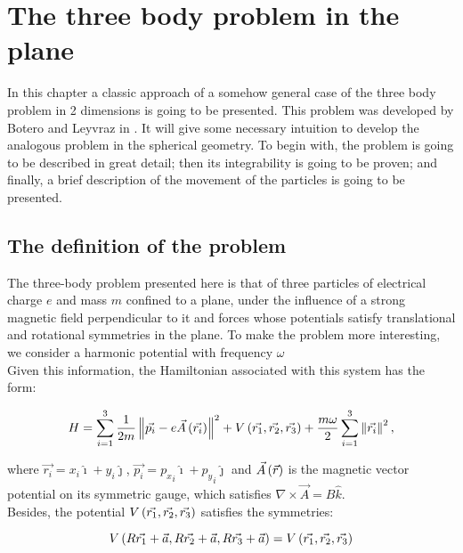 \chapter{The three body problem in the plane}

In this chapter a classic approach of a somehow general case of the three body problem in 2 dimensions is going to be presented. This problem was developed by Botero and Leyvraz in \cite{alonso}. It will give some necessary intuition to develop the analogous problem in the spherical geometry. To begin with, the problem is going to be described in great detail; then its integrability is going to be proven; and finally, a brief description of the movement of the particles is going to be presented.\\

\section{The definition of the problem}

The three-body problem presented here is that of three particles of electrical charge $e$ and mass $m$ confined to a plane, under the influence of a strong magnetic field perpendicular to it and forces whose potentials satisfy translational and rotational symmetries in the plane. To make the problem more interesting, we consider a harmonic potential with frequency $\omega$\\

Given this information, the Hamiltonian associated with this system has the form:

\begin{equation}
H = \sum_{i=1}^{3} \frac{1}{2m} \left\lVert  \vec{p_i} - 
e\vec{ A } \left( \vec{r_i} \right) \right\rVert^2
+ V \left(  \vec{r_1},\vec{r_2},\vec{r_3}  \right)
+\frac{m\omega}{2}\sum_{i=1}^{3} \left\lVert \vec{r_i} \right\rVert^2,
\label{eq:ham2d}
\end{equation}

where $\vec{r_i} = x_i \hat{\imath} + y_i \hat{\jmath}$, $\vec{p_i} = {p_x}_i\hat{\imath} + {p_y}_i\hat{\jmath}$ and $\vec{A}\left( \vec{r} \right)$ is the magnetic vector potential on its symmetric gauge, which satisfies $\nabla \times \vec{A} = B\hat{k}$.\\

Besides, the potential $V \left(  \vec{r_1},\vec{r_2},\vec{r_3}  \right)$ satisfies the symmetries:

\begin{equation}
V \left(  R\vec{r_1}+\vec{a},R\vec{r_2}+\vec{a},R\vec{r_3}+\vec{a}   \right)= V \left(  \vec{r_1},\vec{r_2},\vec{r_3}  \right)
\label{eq:vsym}
\end{equation}

